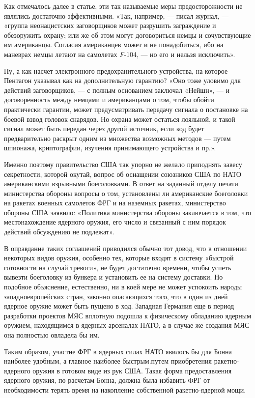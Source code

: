 \documentclass[12pt, a4paper, openany]{book}
\begin{document}
	Как отмечалось далее в статье, эти так называемые меры предосторожности не являлись достаточно эффективными. «Так, например, — писал журнал, — «группа неонацистских заговорщиков может разрушить заграждение и обезоружить охрану; или же об этом могут договориться немцы и сочувствующие им американцы. Согласия американцев может и не понадобиться, ибо на маневрах немцы летают на самолетах \textit{F}-104, — но его и нельзя исключить».
	
	Ну, а как насчет электронного предохранительного устройства, на которое Пентагон указывал как на дополнительную гарантию? «Оно тоже уловимо для действий заговорщиков, — с полным основанием заключал «Нейшн», — и договоренность между немцами и американцами о том, чтобы обойти практически гарантии, может предусматривать передачу сигнала о постановке на боевой взвод головок снарядов. Но охрана может остаться лояльной, и такой сигнал может быть передан через другой источник, если код будет предварительно раскрыт одним из множества возможных методов — путем шпионажа, криптографии, изучения принимающего устройства и пр.».
	
	Именно поэтому правительство США так упорно не желало приподнять завесу секретности, которой окутай, вопрос об оснащении союзников США по НАТО американскими взрывными боеголовками. В ответ на заданный отделу печати министерства обороны вопросы о том, установлены ли американские боеголовки на ракетах военных самолетов ФРГ и на наземных ракетах, министерство обороны США заявило: «Политика министерства обороны заключается в том, что местонахождение ядерного оружия, его число и связанный с ним порядок действий обсуждению не подлежат».
	
	В оправдание таких соглашений приводился обычно тот довод, что в отношении некоторых видов оружия, особенно тех, которые входят в систему «быстрой готовности на случай тревоги», не будет достаточно времени, чтобы успеть вывезти боеголовку из бункера и установить ее на систему доставки. Но подобное объяснение, естественно, ни в коей мере не может успокоить народы западноевропейских стран, законно опасающихся того, что в один из дней ядерное оружие может быть пущено в ход. Западная Германия еще в период разработки проектов МЯС вплотную подошла к физическому обладанию ядерным оружием, находящимся в ядерных арсеналах НАТО, а в случае же создания МЯС она полностью овладела бы им.
	
	Таким образом, участие ФРГ в ядерных силах НАТО явилось бы для Бонна наиболее удобным, а главное наиболее быстрым.путем приобретения ракетно-ядерного оружия в готовом виде из рук США. Такая форма предоставления ядерного оружия, по расчетам Бонна, должна была избавить ФРГ от необходимости терять время на накопление собственной ракетно-ядерной мощи.
	
\end{document}
